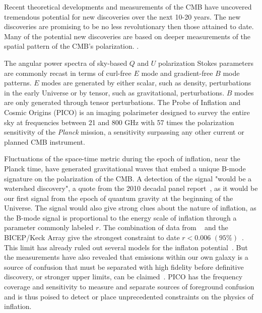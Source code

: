 \documentclass[PICOReport.tex]{subfiles}
\begin{document}

Recent theoretical developments and measurements of the \ac{CMB} 
have uncovered tremendous potential for new discoveries over the next 10-20 years. The new discoveries are promising to be 
no less revolutionary then those attained to date. Many of the potential new discoveries are based on deeper
measurements of the spatial pattern of the CMB's polarization. .

The angular power spectra of sky-based $Q$ and $U$ polarization Stokes parameters are commonly recast in terms
of curl-free $E$ mode and gradient-free $B$ mode patterns. $E$ modes are generated by either scalar, such as density, perturbations
in the early Universe or by tensor, such as gravitational, perturbations. $B$ modes are only generated through tensor
perturbations. The Probe of Inflation and Cosmic Origins (PICO) is an imaging polarimeter designed to survey the entire 
sky at frequencies between 21 and 800 GHz with 57 times the polarization sensitivity of the {\it Planck} mission, a sensitivity 
surpassing any other current or planned CMB instrument. 

Fluctuations of the space-time metric during the epoch of inflation, near the Planck time, have generated gravitational waves 
that embed a unique B-mode signature on the polarization of the CMB. A detection of the signal "would be a watershed discovery", 
a quote from the 2010 decadal panel report~\citep{nwnh}, as it would be our first signal from the epoch of quantum gravity 
at the beginning of the Universe. The signal would also give strong clues 
about the nature of inflation, as the B-mode signal is proportional to the energy scale of inflation through a parameter 
commonly labeled $r$. 
The combination of data from \planck~ and the BICEP/Keck Array give the strongest constraint to date 
$r<0.006\,\, (95\%)$~\citep{rlimit}.  This limit has already ruled out several 
models for the inflaton potential~\citep{planck2018inflation}. 
But the measurements have also 
revealed that emissions within our own galaxy is a source of confusion that must be separated with high fidelity 
before definitive discovery, or stronger upper limits, can be claimed~\citep{whichplanck}. 
PICO has the frequency coverage and sensitivity to measure and separate sources of foreground confusion and is thus 
poised to detect or place unprecedented constraints on the physics of inflation. 
\end{document}

